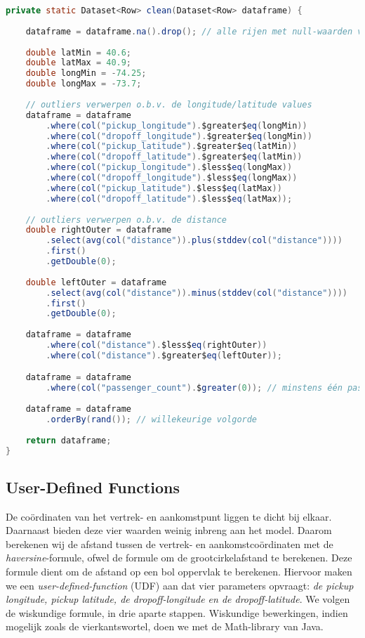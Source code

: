 \documentclass[a4paper,10pt,twoside]{report}
\begin{document}
\begin{lstlisting}[language=Java]
private static Dataset<Row> clean(Dataset<Row> dataframe) {
	
	dataframe = dataframe.na().drop(); // alle rijen met null-waarden verwerpen
	
	double latMin = 40.6;
	double latMax = 40.9;
	double longMin = -74.25;
	double longMax = -73.7;
	
	// outliers verwerpen o.b.v. de longitude/latitude values
	dataframe = dataframe
		.where(col("pickup_longitude").$greater$eq(longMin))
		.where(col("dropoff_longitude").$greater$eq(longMin))
		.where(col("pickup_latitude").$greater$eq(latMin))
		.where(col("dropoff_latitude").$greater$eq(latMin))
		.where(col("pickup_longitude").$less$eq(longMax))
		.where(col("dropoff_longitude").$less$eq(longMax))
		.where(col("pickup_latitude").$less$eq(latMax))
		.where(col("dropoff_latitude").$less$eq(latMax));
	
	// outliers verwerpen o.b.v. de distance
	double rightOuter = dataframe
		.select(avg(col("distance")).plus(stddev(col("distance"))))
		.first()
		.getDouble(0);
		
	double leftOuter = dataframe
		.select(avg(col("distance")).minus(stddev(col("distance"))))
		.first()
		.getDouble(0);
		
	dataframe = dataframe
		.where(col("distance").$less$eq(rightOuter))
		.where(col("distance").$greater$eq(leftOuter));

	dataframe = dataframe
		.where(col("passenger_count").$greater(0)); // minstens één passagier in de taxi
	
	dataframe = dataframe
		.orderBy(rand()); // willekeurige volgorde
	
	return dataframe;
}
\end{lstlisting}

\newpage

\subsection*{User-Defined Functions}

De coördinaten van het vertrek- en aankomstpunt liggen te dicht bij elkaar. Daarnaast bieden deze vier waarden weinig inbreng aan het model. Daarom berekenen wij de afstand tussen de vertrek- en aankomstcoördinaten met de \textit{haversine}-formule, ofwel de formule om de grootcirkelafstand te berekenen. Deze formule dient om de afstand op een bol oppervlak te berekenen. Hiervoor maken we een \textit{user-defined-function} (UDF) aan dat vier parameters opvraagt: \textit{de pickup longitude, pickup latitude, de dropoff-longitude en de dropoff-latitude}. We volgen de wiskundige formule, in drie aparte stappen. Wiskundige bewerkingen, indien mogelijk zoals de vierkantswortel, doen we met de Math-library van Java.
\end{document}
